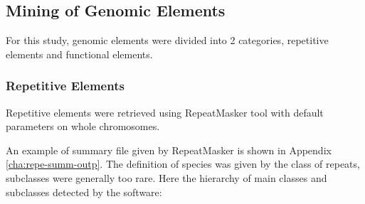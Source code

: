 \subsection{Mining of Genomic Elements}

For this study, genomic elements were divided into 2 categories, repetitive elements and functional elements.

\subsubsection{Repetitive Elements}

Repetitive elements were retrieved using RepeatMasker tool \cite{Smit2010} with default parameters on whole chromosomes. 

An example of summary file given by RepeatMasker is shown in Appendix \ref{cha:repe-summ-outp}. The definition of species was given by the class of repeats, subclasses were generally too rare. Here the hierarchy of main classes and subclasses detected by the software:
